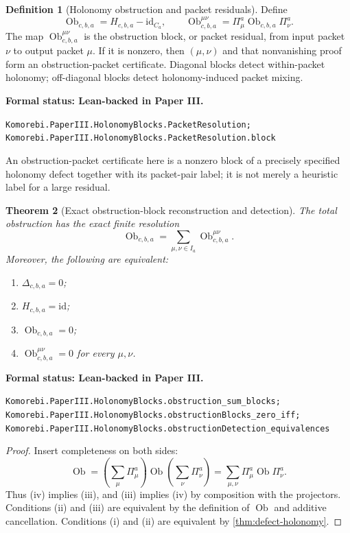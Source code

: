 \documentclass[11pt]{article}
\newtheorem{theorem}{Theorem}[section]
\theoremstyle{definition}
\newtheorem{definition}[theorem]{Definition}
\theoremstyle{remark}
\newcommand{\id}{\mathrm{id}}
\newcommand{\Ob}{\operatorname{Ob}}
\newcommand{\leanname}[1]{\nolinkurl{#1}}
\newcommand{\statusleanthree}[1]{%
  \par\smallskip\noindent
  {\color{leanblue}\textbf{Formal status: Lean-backed in Paper III.}}\par
  \begingroup\small\raggedright\leanname{#1}\par\endgroup\smallskip}
\begin{document}
\begin{definition}[Holonomy obstruction and packet residuals]
\label{def:obstruction-packet}
Define
\[
\Ob_{c,b,a}=H_{c,b,a}-\id_{C_a},
\qquad
\Ob^{\mu\nu}_{c,b,a}
=
\Pi^a_\mu\Ob_{c,b,a}\Pi^a_\nu.
\]
The map $\Ob^{\mu\nu}_{c,b,a}$ is the obstruction block, or packet residual,
from input packet $\nu$ to output packet $\mu$.  If it is nonzero, then
$(\mu,\nu)$ and that nonvanishing proof form an obstruction-packet
certificate.  Diagonal blocks detect within-packet holonomy; off-diagonal
blocks detect holonomy-induced packet mixing.
\end{definition}
\statusleanthree{Komorebi.PaperIII.HolonomyBlocks.PacketResolution; Komorebi.PaperIII.HolonomyBlocks.PacketResolution.block}

An obstruction-packet certificate here is a nonzero block of a precisely
specified holonomy defect together with its packet-pair label; it is not
merely a heuristic label for a large residual.

\begin{theorem}[Exact obstruction-block reconstruction and detection]
\label{thm:obstruction-detection}
The total obstruction has the exact finite resolution
\[
\boxed{
\Ob_{c,b,a}
=
\sum_{\mu,\nu\in I_a}
\Ob^{\mu\nu}_{c,b,a}.
}
\]
Moreover, the following are equivalent:
\begin{enumerate}[label=(\roman*)]
\item $\Delta_{c,b,a}=0$;
\item $H_{c,b,a}=\id$;
\item $\Ob_{c,b,a}=0$;
\item $\Ob^{\mu\nu}_{c,b,a}=0$ for every $\mu,\nu$.
\end{enumerate}
\end{theorem}
\statusleanthree{Komorebi.PaperIII.HolonomyBlocks.obstruction_sum_blocks; Komorebi.PaperIII.HolonomyBlocks.obstructionBlocks_zero_iff; Komorebi.PaperIII.HolonomyBlocks.obstructionDetection_equivalences}

\begin{proof}
Insert completeness on both sides:
\[
\Ob
=
\left(\sum_\mu\Pi^a_\mu\right)
\Ob
\left(\sum_\nu\Pi^a_\nu\right)
=
\sum_{\mu,\nu}\Pi^a_\mu\Ob\Pi^a_\nu.
\]
Thus (iv) implies (iii), and (iii) implies (iv) by composition with the
projectors.  Conditions (ii) and (iii) are equivalent by the definition of
$\Ob$ and additive cancellation.
Conditions (i) and (ii) are equivalent by
\cref{thm:defect-holonomy}.
\end{proof}
\end{document}
